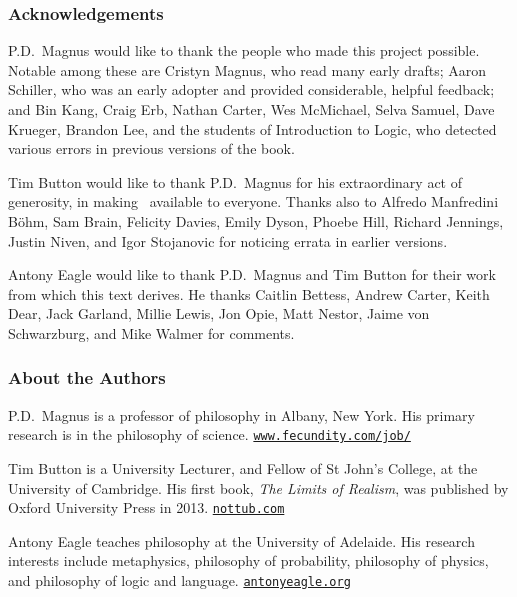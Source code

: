 \thispagestyle{empty}
\onecolumn



\subsubsection*{Acknowledgements}
P.D.\ Magnus would like to thank the people who made this project possible. Notable among these are Cristyn Magnus, who read many early drafts; Aaron Schiller, who was an early adopter and provided considerable, helpful feedback; {and} Bin Kang, Craig Erb, Nathan Carter, Wes McMichael, Selva Samuel,  Dave Krueger, Brandon Lee, and the students of Introduction to Logic, who detected various errors in previous versions of the book. \medskip

Tim Button would like to thank P.D.\ Magnus for his extraordinary act of generosity, in making \forallx\ available to everyone. Thanks also to Alfredo Manfredini Böhm, Sam Brain, Felicity Davies, Emily Dyson, Phoebe Hill, Richard Jennings, Justin Niven,  and Igor Stojanovic for noticing errata in earlier versions. \medskip

Antony Eagle would like to thank P.D.\ Magnus and Tim Button for their work from which this text derives. He thanks Caitlin Bettess, Andrew Carter, Keith Dear, Jack Garland, Millie Lewis, Jon Opie, Matt Nestor, Jaime von Schwarzburg, and Mike Walmer for comments. %

\subsubsection*{About the Authors}


P.D.\ Magnus is a professor of philosophy in Albany, New York. His primary research is in the philosophy of science. \href{https://www.fecundity.com/job/}{\nolinkurl{www.fecundity.com/job/}}
\medskip

Tim Button is a University Lecturer, and Fellow of St John's College, at the University of Cambridge. His first book, \emph{The Limits of Realism}, was published by Oxford University Press in 2013. \href{http://nottub.com}{\nolinkurl{nottub.com}}
\medskip

Antony Eagle teaches philosophy at the University of Adelaide. His research interests include metaphysics, philosophy of probability, philosophy of physics, and philosophy of logic and language. \href{https://antonyeagle.org}{\nolinkurl{antonyeagle.org}}




